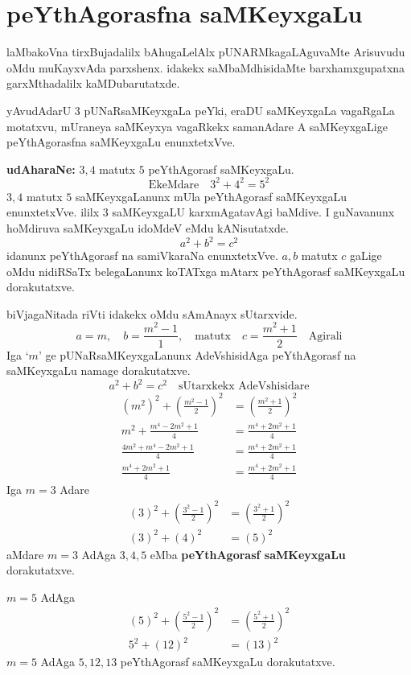 \chapter{peYthAgorasfna saMKeyxgaLu}
\vskip -20pt

laMbakoVna tirxBujadalilx bAhugaLelAlx pUNARMkagaLAguvaMte Arisuvudu oMdu muKayxvAda parxshenx. idakekx saMbaMdhisidaMte barxhamxgupatxna garxMthadalilx kaMDubarutatxde.

yAvudAdarU $3$ pUNaRsaMKeyxgaLa peYki, eraDU saMKeyxgaLa vagaRgaLa motatxvu, mUraneya saMKeyxya vagaRkekx samanAdare A saMKeyxgaLige peYthAgorasfna saMKeyxgaLu enunxtetxVve.

\textbf{udAharaNe:} $3,4$ matutx $5$  peYthAgorasf saMKeyxgaLu.
$$
\text{EkeMdare}\quad 3^2+4^2=5^2
$$
$3,4$ matutx $5$ saMKeyxgaLanunx mUla peYthAgorasf saMKeyxgaLu enunxtetxVve. ililx $3$ saMKeyx\-gaLU karxmAgatavAgi baMdive. I guNavanunx hoMdiruva saMKeyxgaLu idoMdeV eMdu kANisutatxde.
$$
a^2+b^2 = c^2
$$
idanunx peYthAgorasf  na samiVkaraNa enunxtetxVve. $a,b$ matutx $c$ gaLige oMdu nidiRSaTx belegaLanunx koTATxga mAtarx peYthAgorasf saMKeyxgaLu dorakutatxve.

biVjagaNitada riVti idakekx oMdu sAmAnayx sUtarxvide.
$$
a=m, \quad b= \frac{m^2-1}{1}, \quad\text{matutx} \quad c=\frac{m^2+1}{2} \quad \text{Agirali}
$$
Iga `$m$' ge pUNaRsaMKeyxgaLanunx AdeVshisidAga peYthAgorasf na saMKeyxgaLu namage dorakutatxve.
$$
a^2+b^2=c^2 \quad\text{sUtarxkekx AdeVshisidare}
$$
\begin{align*}
\left(m^2\right)^2+\left(\frac{m^2-1}{2}\right)^2 &= \left(\frac{m^2+1}{2}\right)^2\\
m^2+ \frac{m^4-2m^2+1}{4} &= \frac{m^4+2m^2+1}{4}\\
\frac{4m^2+m^4-2m^2+1}{4} &= \frac{m^4+2m^2+1}{4}\\
\frac{m^4+2m^2+1}{4} &= \frac{m^4+2m^2+1}{4}
\end{align*}
Iga $m=3$ Adare
\begin{align*}
(3)^2+\left(\frac{3^{2}-1}{2}\right)^2 &= \left(\frac{3^2+1}{2}\right)^2\\
(3)^2+(4)^2 &= (5)^2
\end{align*}
aMdare $m=3$ AdAga $3,4,5$ eMba {\bf peYthAgorasf saMKeyxgaLu} dorakutatxve.

$m=5$ \quad AdAga
\begin{align*}
(5)^2 + \left(\frac{5^2-1}{2}\right)^2 &= \left(\frac{5^2+1}{2}\right)^2\\
5^2 +(12)^2 &= (13)^2
\end{align*}
$m=5$ AdAga $5,12,13$ peYthAgorasf saMKeyxgaLu dorakutatxve.

